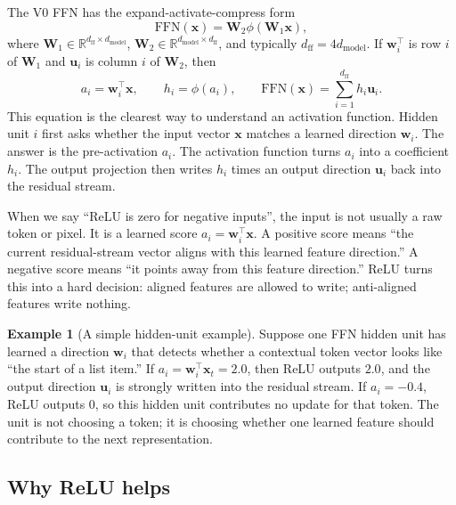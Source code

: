 \documentclass[11pt,a4paper]{article}
\theoremstyle{definition}
\newtheorem{example}{Example}[section]
\theoremstyle{plain}
\newcommand{\vx}{\bm{x}}
\newcommand{\vu}{\bm{u}}
\newcommand{\vw}{\bm{w}}
\newcommand{\mW}{\bm{W}}
\newcommand{\reals}{\mathbb{R}}
\newcommand{\dmodel}{d_{\mathrm{model}}}
\newcommand{\dff}{d_{\mathrm{ff}}}
\begin{document}
The V0 FFN has the expand-activate-compress form
\begin{equation}\label{eq:standard_ffn}
    \mathrm{FFN}(\vx)=\mW_2\phi(\mW_1\vx),
\end{equation}
where $\mW_1\in\reals^{\dff\times\dmodel}$, $\mW_2\in\reals^{\dmodel\times\dff}$, and typically $\dff=4\dmodel$. If $\vw_i^\top$ is row $i$ of $\mW_1$ and $\vu_i$ is column $i$ of $\mW_2$, then
\begin{equation}
    a_i=\vw_i^\top\vx,
    \qquad
    h_i=\phi(a_i),
    \qquad
    \mathrm{FFN}(\vx)=\sum_{i=1}^{\dff}h_i\vu_i.
\end{equation}
This equation is the clearest way to understand an activation function. Hidden unit $i$ first asks whether the input vector $\vx$ matches a learned direction $\vw_i$. The answer is the pre-activation $a_i$. The activation function turns $a_i$ into a coefficient $h_i$. The output projection then writes $h_i$ times an output direction $\vu_i$ back into the residual stream.

\begin{motivationbox}
When we say ``ReLU is zero for negative inputs'', the input is not usually a raw token or pixel. It is a learned score $a_i=\vw_i^\top\vx$. A positive score means ``the current residual-stream vector aligns with this learned feature direction.'' A negative score means ``it points away from this feature direction.'' ReLU turns this into a hard decision: aligned features are allowed to write; anti-aligned features write nothing.
\end{motivationbox}

\begin{example}[A simple hidden-unit example]
Suppose one FFN hidden unit has learned a direction $\vw_i$ that detects whether a contextual token vector looks like ``the start of a list item.'' If $a_i=\vw_i^\top\vx_t=2.0$, then ReLU outputs $2.0$, and the output direction $\vu_i$ is strongly written into the residual stream. If $a_i=-0.4$, ReLU outputs $0$, so this hidden unit contributes no update for that token. The unit is not choosing a token; it is choosing whether one learned feature should contribute to the next representation.
\end{example}

\subsection{Why ReLU helps}
\end{document}
